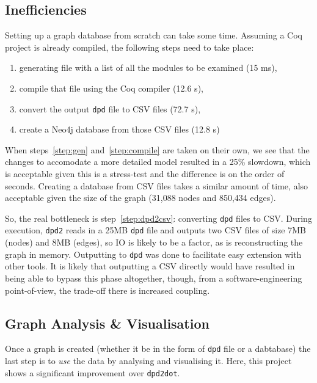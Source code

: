 \subsection{Inefficiencies}

Setting up a graph database from scratch can take some time. Assuming a Coq
project is already compiled, the following steps need to take place:

\begin{enumerate}
  \item\label{step:gen} generating file with a list of all the modules to be
    examined (15 ms),
  \item\label{step:compile} compile that file using the Coq compiler (12.6 s),
  \item\label{step:dpd2csv} convert the output \texttt{dpd} file to CSV files (72.7 s),
  \item create a Neo4j database from those CSV files (12.8 s)
\end{enumerate}

When steps~\ref{step:gen} and~\ref{step:compile} are taken on their own, we see
that the changes to accomodate a more detailed model resulted in a 25\%
slowdown, which is acceptable given this is a stress-test and the difference is
on the order of seconds. Creating a database from CSV files takes a similar
amount of time, also acceptable given the size of the graph (31,088 nodes and
850,434 edges).

So, the real bottleneck is step~\ref{step:dpd2csv}: converting \texttt{dpd}
files to CSV. During execution, \texttt{dpd2} reads in a 25MB \texttt{dpd} file
and outputs two CSV files of size 7MB (nodes) and 8MB (edges), so IO is likely
to be a factor, as is reconstructing the graph in memory. Outputting to
\texttt{dpd} was done to facilitate easy extension with other tools. It is
likely that outputting a CSV directly would have resulted in being able to
bypass this phase altogether, though, from a software-engineering
point-of-view, the trade-off there is increased coupling.

\subsection{Graph Analysis \& Visualisation}

Once a graph is created (whether it be in the form of \texttt{dpd} file or a
dabtabase) the last step is to \emph{use} the data by analysing and visualising
it. Here, this project shows a significant improvement over \texttt{dpd2dot}.

